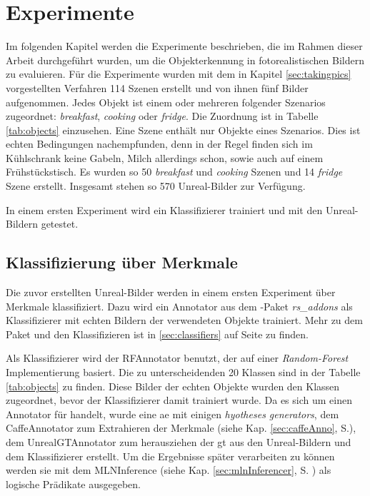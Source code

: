 \graphicspath{{./images/}}      
\def\CHAPTERONE{./chapters/Chapter-1} 

\chapter{Experimente}
\label{chap:experiments}
%	

Im folgenden Kapitel werden die Experimente beschrieben, die im Rahmen dieser Arbeit durchgeführt wurden, um die Objekterkennung in fotorealistischen Bildern zu evaluieren. Für die Experimente wurden mit dem in Kapitel \ref{sec:takingpics} vorgestellten Verfahren 114 Szenen erstellt und von ihnen fünf Bilder aufgenommen. Jedes Objekt ist einem oder mehreren folgender Szenarios zugeordnet: \textit{breakfast}, \textit{cooking} oder \textit{fridge}. Die Zuordnung ist in Tabelle \ref{tab:objects} einzusehen. Eine Szene enthält nur Objekte eines Szenarios. Dies ist echten Bedingungen nachempfunden, denn in der Regel finden sich im Kühlschrank keine Gabeln, Milch allerdings schon, sowie auch auf einem Frühstückstisch. Es wurden so 50 \textit{breakfast} und \textit{cooking} Szenen und 14 \textit{fridge} Szene erstellt. Insgesamt stehen so 570 Unreal-Bilder zur Verfügung. \par
In einem ersten Experiment wird ein Klassifizierer trainiert und mit den Unreal-Bildern getestet.  


\section{Klassifizierung über Merkmale}
\label{sec:classificationExperiment}
Die zuvor erstellten Unreal-Bilder werden in einem ersten Experiment über Merkmale klassifiziert. Dazu wird ein Annotator aus dem \robosherlock-Paket \textit{rs\_addons} als Klassifizierer mit echten Bildern der verwendeten Objekte trainiert. Mehr zu dem Paket und den Klassifizieren ist in \ref{sec:classifiers} auf Seite \pageref{sec:classifiers} zu finden. \par

Als Klassifizierer wird der RFAnnotator benutzt, der auf einer \textit{Random-Forest} Implementierung basiert. Die zu unterscheidenden 20 Klassen sind in der Tabelle \ref{tab:objects} zu finden. Diese Bilder der echten Objekte wurden den Klassen zugeordnet, bevor der Klassifizierer damit trainiert wurde. Da es sich um einen Annotator für \robosherlock handelt, wurde eine \gls{ae} mit einigen \textit{hyotheses generators}, dem CaffeAnnotator zum Extrahieren der Merkmale (siehe Kap. \ref{sec:caffeAnno}, S.\pageref{sec:caffeAnno}), dem UnrealGTAnnotator zum herausziehen der \gls{gt} aus den Unreal-Bildern und dem Klassifizierer erstellt. Um die Ergebnisse später verarbeiten zu können werden sie mit dem MLNInference (siehe Kap. \ref{sec:mlnInferencer}, S. \pageref{sec:mlnInferencer}) als logische Prädikate ausgegeben. \par
 
